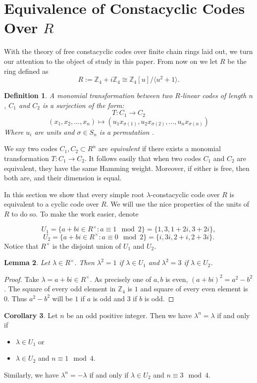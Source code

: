 \documentclass[a4paper, 12pt]{amsart}
\newtheorem{lemma}{Lemma}[section]
\newtheorem{defn}[lemma]{Definition}
\theoremstyle{definition}
\newtheorem{corollary}[lemma]{Corollary}
\newcommand{\Z}{{\mathbb Z}}
\newcommand{\lm}{\lambda}
\numberwithin{equation}{section}
\numberwithin{table}{section}
\begin{document}
\section{Equivalence of Constacyclic Codes Over $R$}\label{equivcyclic}

With the theory of free constacyclic codes over finite chain rings laid out, we turn our attention to the object of study in this paper. From now on we let $R$ be the ring defined as
\[ R:= \mathbb{Z}_4+ i\Z_4 \cong \mathbb{Z}_4[u] /\langle u^2+1 \rangle.\]


    \begin{defn}A monomial transformation between two $R$-linear codes of length $n$, $C_1$ and $C_2$ is a surjection of the form: 
    \[ T: C_1 \to C_2\]
    \[ (x_1,x_2,...,x_n) \mapsto (u_1x_{\sigma(1)}, u_2x_{\sigma(2)},..., u_nx_{\sigma(n)})\]
    Where $u_i$ are units and $\sigma \in S_n$ is a permutation \cite{eqcodesoverfiniterings}. 
    \end{defn}
    
    We say two codes $C_1,C_2 \subset R^n$ are \emph{equivalent} if there exists a monomial transformation $T: C_1 \to C_2$. It follows easily that when two codes $C_1$ and $C_2$ are equivalent, they have the same Hamming weight. Moreover, if either is free, then both are, and their dimension is equal.

In this section we show that every simple root $\lambda$-constacyclic code over $R$ is equivalent to a cyclic code over $R$. We will use the nice properties of the units of $R$ to do so. To make the work easier, denote

\[ U_1 = \{a+bi \in R^\times: a \equiv 1 \mod 2\} = \{1,3,1+2i,3+2i\},\]
\[U_2 = \{a+bi \in R^\times: a \equiv0\mod2\} = \{i,3i, 2+i, 2+3i\}.\]
Notice that $R^\times$ is the disjoint union of $U_1$ and $U_2.$

\begin{lemma}\label{squareunitsR}
    Let $\lm\in R^\times$. Then $\lm^2 = 1$ if $\lambda \in U_1$ and $\lm^2 = 3$ if $\lambda \in U_2$.
\end{lemma}
\begin{proof}
    Take $\lm = a+bi \in R^\times$. As precisely one of $a,b$ is even, $(a+bi)^2 = a^2 -b^2$. The square of every odd element in $\Z_4$ is $1$ and square of every even element is $0$. Thus $a^2-b^2$ will be $1$ if $a$ is odd and $3$ if $b$ is odd.
\end{proof}

\begin{corollary}\label{caseseq}
    Let $n$ be an odd positive integer. Then we have $\lm^n = \lm$ if and only if 
    \begin{itemize}
        \item $\lm \in U_1$ or
        \item $\lm \in U_2$ and $n \equiv 1 \mod 4$.
    \end{itemize}
         Similarly, we have  $\lm^n = -\lm$ if and only if $\lm \in U_2$ and $n \equiv 3 \mod 4$.
   
\end{corollary}
\end{document}
